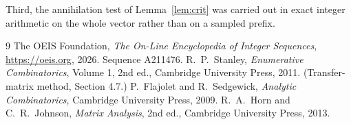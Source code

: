 \documentclass[11pt,a4paper]{article}
\theoremstyle{plain}
\theoremstyle{definition}
\begin{document}
Third, the annihilation test of Lemma~\ref{lem:crit} was carried out in exact integer
arithmetic on the whole vector rather than on a sampled prefix.

\begin{thebibliography}{9}
 The OEIS Foundation, \emph{The On-Line Encyclopedia of Integer
Sequences}, \url{https://oeis.org}, 2026. Sequence A211476.
 R.~P.~Stanley, \emph{Enumerative Combinatorics}, Volume 1, 2nd ed.,
Cambridge University Press, 2011. (Transfer-matrix method, Section 4.7.)
 P.~Flajolet and R.~Sedgewick, \emph{Analytic Combinatorics}, Cambridge
University Press, 2009.
 R.~A.~Horn and C.~R.~Johnson, \emph{Matrix Analysis}, 2nd ed., Cambridge
University Press, 2013.
\end{thebibliography}
\end{document}
